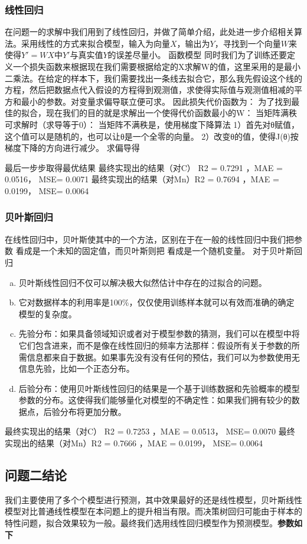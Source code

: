 \documentclass{xcumcmart}
\begin{document}
\subsubsection{线性回归}
\par 在问题一的求解中我们用到了线性回归，并做了简单介绍，此处进一步介绍相关算法。采用线性的方式来拟合模型，输入为向量$X$，输出为$Y$，寻找到一个向量$W$来使得$Y'=WX$中$Y'$与真实值$Y$的误差尽量小。
函数模型
同时我们为了训练还要定义一个损失函数来根据现在我们需要根据给定的X求解W的值，这里采用的是最小二乘法。在给定的样本下，我们需要找出一条线去拟合它，那么我先假设这个线的方程，然后把数据点代入假设的方程得到观测值，求使得实际值与观测值相减的平方和最小的参数。对变量求偏导联立便可求。
因此损失代价函数为：
为了找到最佳的拟合，现在我们的目的就是求解出一个使得代价函数最小的W：
当矩阵满秩可求解时（求导等于0）：
当矩阵不满秩是，使用梯度下降算法
1）首先对θ赋值，这个值可以是随机的，也可以让θ是一个全零的向量。
2）改变θ的值，使得J(θ)按梯度下降的方向进行减少。
求偏导得

最后一步步取得最优结果
最终实现出的结果（对C） R2 = 0.7291 ，MAE = 0.0516， MSE= 0.0071
最终实现出的结果（对Mn）R2 = 0.7694 ，MAE = 0.0199， MSE= 0.0064
\subsubsection{贝叶斯回归}
\par 在线性回归中，贝叶斯使其中的一个方法，区别在于在一般的线性回归中我们把参数 看成是一个未知的固定值，而贝叶斯则把 看成是一个随机变量。
对于贝叶斯回归
\begin{enumerate}[(a)]
\item 贝叶斯线性回归不仅可以解决极大似然估计中存在的过拟合的问题。
\item 它对数据样本的利用率是100\%，仅仅使用训练样本就可以有效而准确的确定模型的复杂度。
\item 先验分布：如果具备领域知识或者对于模型参数的猜测，我们可以在模型中将它们包含进来，而不是像在线性回归的频率方法那样：假设所有关于参数的所需信息都来自于数据。如果事先没有没有任何的预估，我们可以为参数使用无信息先验，比如一个正态分布。
\item 后验分布：使用贝叶斯线性回归的结果是一个基于训练数据和先验概率的模型参数的分布。这使得我们能够量化对模型的不确定性：如果我们拥有较少的数据点，后验分布将更加分散。
\end{enumerate}

最终实现出的结果（对C） R2 = 0.7253 ，MAE = 0.0513， MSE= 0.0070
最终实现出的结果（对Mn）R2 = 0.7666 ，MAE = 0.0199， MSE= 0.0064
\subsection{问题二结论}
我们主要使用了多个个模型进行预测，其中效果最好的还是线性模型，贝叶斯线性模型对比普通线性模型在本问题上的提升相当有限。而决策树回归可能由于样本的特性问题，拟合效果较为一般。最终我们选用线性回归模型作为预测模型。\textbf{参数如下}
\end{document}
